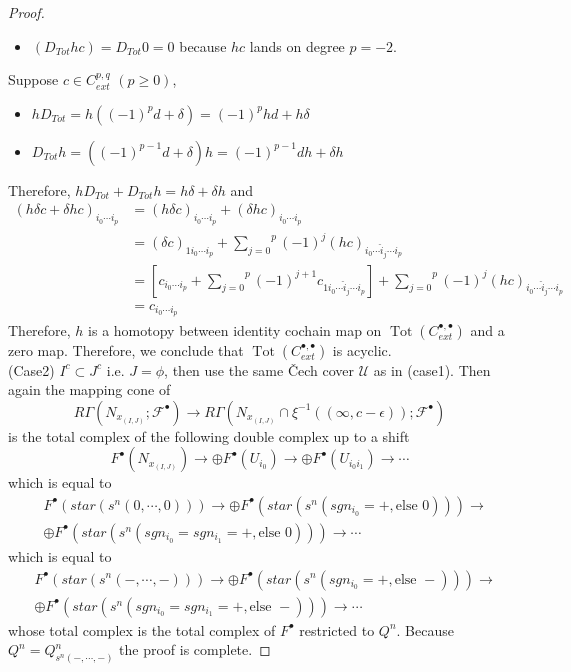 \begin{proof}
\begin{itemize}
\item $(D_{Tot}hc) = D_{Tot}0=0$ because $hc$ lands on degree $p=-2$.
\end{itemize}
Suppose $c\in C_{ext}^{p,q}$ $(p\geq 0)$,
\begin{itemize}
\item $hD_{Tot} = h((-1)^p d+\delta) = (-1)^p hd + h\delta$

\item $D_{Tot}h = ((-1)^{p-1}d + \delta)h = (-1)^{p-1}dh + \delta h$
\end{itemize}
Therefore, $hD_{Tot}+D_{Tot}h = h\delta + \delta h$ and 
\begin{align*}
(h\delta c + \delta hc)_{i_0 \cdots i_p} &= (h\delta c)_{i_0 \cdots i_p} + (\delta hc)_{i_0 \cdots i_p}\\
&= (\delta c)_{1i_0 \cdots i_p} + \overset{p}{\underset{j=0}{\sum}}
(-1)^j (hc)_{i_0 \cdots \hat{i}_j \cdots i_p}\\
&= [ c_{i_0 \cdots i_p} + \overset{p}{\underset{j=0}{\sum}}
(-1)^{j+1} c_{1i_0 \cdots \hat{i}_j \cdots i_p}] +  \overset{p}{\underset{j=0}{\sum}}
(-1)^j (hc)_{i_0 \cdots \hat{i}_j \cdots i_p}\\
&= c_{i_0 \cdots i_p}
\end{align*}
Therefore, $h$ is a homotopy between identity cochain map on $\operatorname{Tot}(C_{ext}^{\bullet,\bullet})$ and a zero map. Therefore, we conclude that $\operatorname{Tot}(C_{ext}^{\bullet,\bullet})$ is acyclic.\\
(Case2) $I^c \subset J^c$ i.e. $J=\phi$, then use the same \v{C}ech cover $\mathcal{U}$ as in (case1). Then again the mapping cone of
\[R\Gamma(N_{x_{(I,J)}};\mathscr{F}^\bullet) \rightarrow R\Gamma(N_{x_{(I,J)}} \cap \xi^{-1}((\infty,c-\epsilon));\mathscr{F}^\bullet)
\]
is the total complex of the following double complex up to a shift
\[
F^\bullet (N_{x_{(I,J)}})\rightarrow \oplus F^\bullet(U_{i_0}) \rightarrow \oplus F^\bullet(U_{i_0 i_1}) \rightarrow \cdots
\]
which is equal to 
\begin{align*}
&F^\bullet (star(s^n(0,\cdots,0)))\rightarrow \oplus F^\bullet(star(s^n(sgn_{i_0} = +,\text{else }0))) \rightarrow \\
&\oplus F^\bullet(star(s^n(sgn_{i_0}=sgn_{i_1} = +,\text{else }0))) \rightarrow \cdots
\end{align*}
which is equal to 
\begin{align*}
&F^\bullet (star(s^n(-,\cdots,-)))\rightarrow\oplus F^\bullet(star(s^n(sgn_{i_0} = +,\text{else }-))) \rightarrow \\
&\oplus F^\bullet(star(s^n(sgn_{i_0}=sgn_{i_1} = +,\text{else }-))) \rightarrow \cdots
\end{align*}
whose total complex is the total complex of $F^\bullet$ restricted to $Q^n$. Because $Q^n = Q^n_{s^n(-,\cdots,-)}$ the proof is complete.
\end{proof}